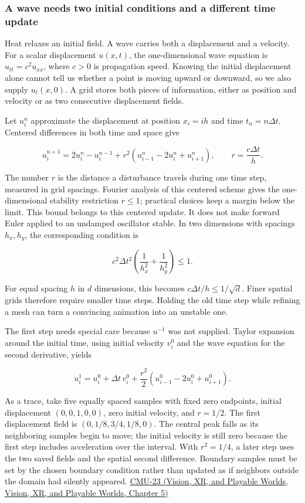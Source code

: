 \subsubsection{A wave needs two initial conditions and a different time update}\label{04-visual-computing-ii-ch030-a-wave-needs-two-initial-conditions-and-a-different-time-update}

Heat relaxes an initial field. A wave carries both a displacement and a velocity. For a scalar displacement \(u(x,t)\), the one-dimensional wave equation is \(u_{tt}=c^2u_{xx}\), where \(c>0\) is propagation speed. Knowing the initial displacement alone cannot tell us whether a point is moving upward or downward, so we also supply \(u_t(x,0)\). A grid stores both pieces of information, either as position and velocity or as two consecutive displacement fields.

Let \(u_i^n\) approximate the displacement at position \(x_i=i h\) and time \(t_n=n\Delta t\). Centered differences in both time and space give

\[
u_i^{n+1}=2u_i^n-u_i^{n-1}+r^2(u_{i-1}^n-2u_i^n+u_{i+1}^n),\qquad r=\frac{c\Delta t}{h}.
\]

The number \(r\) is the distance a disturbance travels during one time step, measured in grid spacings. Fourier analysis of this centered scheme gives the one-dimensional stability restriction \(r\leq1\); practical choices keep a margin below the limit. This bound belongs to this centered update. It does not make forward Euler applied to an undamped oscillator stable. In two dimensions with spacings \(h_x,h_y\), the corresponding condition is

\[
c^2\Delta t^2\left(\frac1{h_x^2}+\frac1{h_y^2}\right)\leq1.
\]

For equal spacing \(h\) in \(d\) dimensions, this becomes \(c\Delta t/h\leq1/\sqrt d\). Finer spatial grids therefore require smaller time steps. Holding the old time step while refining a mesh can turn a convincing animation into an unstable one.

The first step needs special care because \(u^{-1}\) was not supplied. Taylor expansion around the initial time, using initial velocity \(v_i^0\) and the wave equation for the second derivative, yields

\[
u_i^1=u_i^0+\Delta t\,v_i^0+\frac{r^2}{2}(u_{i-1}^0-2u_i^0+u_{i+1}^0).
\]

As a trace, take five equally spaced samples with fixed zero endpoints, initial displacement \((0,0,1,0,0)\), zero initial velocity, and \(r=1/2\). The first displacement field is \((0,1/8,3/4,1/8,0)\). The central peak falls as its neighboring samples begin to move; the initial velocity is still zero because the first step includes acceleration over the interval. With \(r^2=1/4\), a later step uses the two saved fields and the spatial second difference. Boundary samples must be set by the chosen boundary condition rather than updated as if neighbors outside the domain had silently appeared. \href{../07-Vision-XR-and-Playable-Worlds/main.pdf\#nameddest=04-visual-computing-ii-ch036-cmu-23---physically-based-animation-and-pdes}{CMU-23 (Vision, XR, and Playable Worlds, Vision, XR, and Playable Worlds, Chapter 5)}

